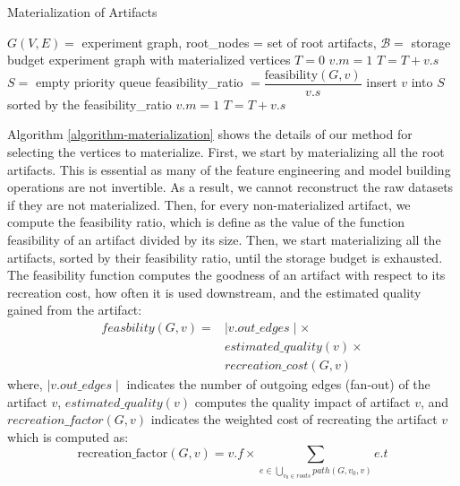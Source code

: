 \begin{algorithm}[h]
\caption{Materialization of Artifacts}\label{algorithm-materialization}
\begin{algorithmic}[1]
\Require  $G(V,E)=$ experiment graph, root\_nodes = set of root artifacts, $\mathcal{B}=$ storage budget
\Ensure experiment graph with materialized vertices
\State $T= 0$ 
 
	\State $v.m = 1$
	\State $T = T + v.s$
\EndFor
\State $S = $ empty priority queue
		\State feasibility\_ratio $= \dfrac{\text{feasibility}(G, v)}{v.s}$
		\State insert $v$ into $S$ sorted by the feasibility\_ratio
	\EndIf
\EndFor
{}
		\State $v.m = 1$
		\State $T = T + v.s$		
	\EndIf
\EndFor
\end{algorithmic}
\end{algorithm}
Algorithm \ref{algorithm-materialization} shows the details of our method for selecting the vertices to materialize.
First, we start by materializing all the root artifacts.
This is essential as many of the feature engineering and model building operations are not invertible.
As a result, we cannot reconstruct the raw datasets if they are not materialized.
Then, for every non-materialized artifact, we compute the feasibility ratio, which is define as the value of the function feasibility of an artifact divided by its size.
Then, we start materializing all the artifacts, sorted by their feasibility ratio, until the storage budget is exhausted.
The feasibility function computes the goodness of an artifact with respect to its recreation cost, how often it is used downstream, and the estimated quality gained from the artifact:
\begin{equation}
\begin{split}
feasbility(G,v) = 	& \mid v.out\_edges \mid \times\\
								&	estimated\_quality(v) \times \\
								& recreation\_cost(G,v)  
 \end{split}
\end{equation}
where, $\mid v.out\_edges \mid$ indicates the number of outgoing edges (fan-out) of the artifact $v$, $estimated\_quality(v)$ computes the quality impact of artifact $v$, and $recreation\_factor(G,v)$ indicates the weighted cost of recreating the artifact $v$ which is computed as:
\[
\text{recreation\_factor}(G,v) = v.f \times \sum\limits_{e \in \bigcup\limits_{v_{0}\in roots} path(G, v_{0}, v)} e.t\]
